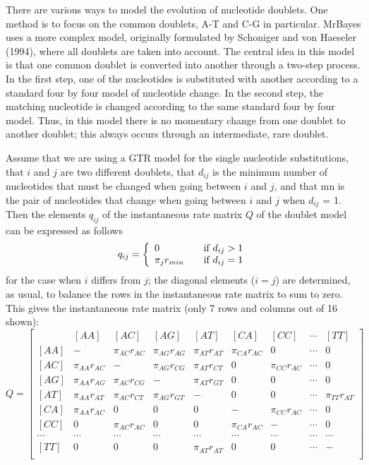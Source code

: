\documentclass[12pt]{book}
\begin{document}
There are various ways to model the evolution of nucleotide doublets. One method is to focus on the
common doublets, A-T and C-G in particular. MrBayes uses a more complex model, originally
formulated by Schoniger and von Haeseler (1994), where all doublets are taken into account. The
central idea in this model is that one common doublet is converted into another through a two-step
process. In the first step, one of the nucleotides is substituted with another according to a
standard four by four model of nucleotide change. In the second step, the matching nucleotide is
changed according to the same standard four by four model. Thus, in this model there is no
momentary change from one doublet to another doublet; this always occurs through an intermediate,
rare doublet.

Assume that we are using a GTR model for the single nucleotide substitutions, that $i$ and $j$ are
two different doublets, that $d_{ij}$ is the minimum number of nucleotides that must be changed
when going between $i$ and $j$, and that mn is the pair of nucleotides that change when going
between $i$ and $j$ when $d_{ij}$ = 1. Then the elements $q_{ij}$ of the instantaneous rate matrix
$Q$ of the doublet model can be expressed as follows
\[
q_{ij} = \left\{ 
\begin{array}{l l}
  0 & \quad \text{if} ~d_{ij}>1 \\
 \pi_j r_{min} & \quad \text{if} ~d_{ij}=1\\
\end{array} \right.
\]
for the case when $i$ differs from $j$; the diagonal elements ($i = j$) are determined, as usual,
to balance the rows in the instantaneous rate matrix to sum to zero. This gives the
instantaneous rate matrix (only 7 rows and columns out of 16 shown):
\[
Q=\begin{bmatrix}
    & [AA] & [AC] & [AG] & [AT] & [CA] & [CC] & \cdots & [TT]\\ 
 [AA]& - & \pi_{AC} r_{AC} & \pi_{AG} r_{AG} & \pi_{AT} r_{AT}& \pi_{CA} r_{AC} & 0 & \cdots & 0\\ 
 [AC]& \pi_{AA} r_{AC} & - & \pi_{AG} r_{CG} & \pi_{AT} r_{CT}& 0 & \pi_{CC} r_{AC} & \cdots & 0\\ 
 [AG]& \pi_{AA} r_{AG} & \pi_{AC} r_{CG} & - & \pi_{AT} r_{GT}& 0 & 0 & \cdots & 0 \\ 
 [AT]& \pi_{AA} r_{AT} & \pi_{AC} r_{CT} & \pi_{AG} r_{GT}& -& 0 & 0 & \cdots &  \pi_{TT} r_{AT}\\
 [CA]& \pi_{AA} r_{AC} & 0 & 0 & 0 & - &  \pi_{CC} r_{AC} & \cdots & 0\\
 [CC]& 0 & \pi_{AC} r_{AC} & 0 & 0 & \pi_{CA} r_{AC} & -  & \cdots & 0\\
 \cdots& \cdots& \cdots& \cdots& \cdots& \cdots& \cdots& \cdots& \cdots\\
 [TT]& 0 & 0 & 0 &\pi_{AT} r_{AT} & 0 & 0 & \cdots & -\\
\end{bmatrix}
\]
\end{document}
